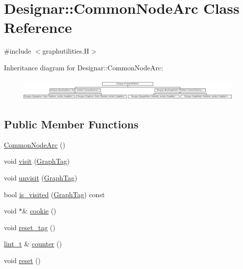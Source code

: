 \hypertarget{class_designar_1_1_common_node_arc}{}\section{Designar\+:\+:Common\+Node\+Arc Class Reference}
\label{class_designar_1_1_common_node_arc}


{\ttfamily \#include $<$graphutilities.\+H$>$}

Inheritance diagram for Designar\+:\+:Common\+Node\+Arc\+:\begin{figure}[H]
\begin{center}
\leavevmode
\includegraphics[height=1.122995cm]{class_designar_1_1_common_node_arc}
\end{center}
\end{figure}
\subsection*{Public Member Functions}
\begin{DoxyCompactItemize}
\item 
\hyperlink{class_designar_1_1_common_node_arc_a7b0794f171cc8ad5b5e4c28216366c53}{Common\+Node\+Arc} ()
\item 
void \hyperlink{class_designar_1_1_common_node_arc_a14b77740fb6d68b1949483c71dd4b197}{visit} (\hyperlink{namespace_designar_ac91366256ea6ea6ac5fd483d55a7499e}{Graph\+Tag})
\item 
void \hyperlink{class_designar_1_1_common_node_arc_ae8f3fed57cacf9e8cfa0df582eeecf3b}{unvisit} (\hyperlink{namespace_designar_ac91366256ea6ea6ac5fd483d55a7499e}{Graph\+Tag})
\item 
bool \hyperlink{class_designar_1_1_common_node_arc_a1852b6cf543bfb695bad590804ecaacd}{is\+\_\+visited} (\hyperlink{namespace_designar_ac91366256ea6ea6ac5fd483d55a7499e}{Graph\+Tag}) const
\item 
void $\ast$\& \hyperlink{class_designar_1_1_common_node_arc_a385a91e2bddd8a6f69d418b36b2cf11e}{cookie} ()
\item 
void \hyperlink{class_designar_1_1_common_node_arc_a436f2993d4da6ec9f750adc465e7c691}{reset\+\_\+tag} ()
\item 
\hyperlink{namespace_designar_a9d113d66a39e82b73727c72cd3a52f73}{lint\+\_\+t} \& \hyperlink{class_designar_1_1_common_node_arc_a8bdada8dfdf47ad02c91cca8c848d287}{counter} ()
\item 
void \hyperlink{class_designar_1_1_common_node_arc_a1dd1385837012b02ee3c67a7e3f5ccc1}{reset} ()
\end{DoxyCompactItemize}


